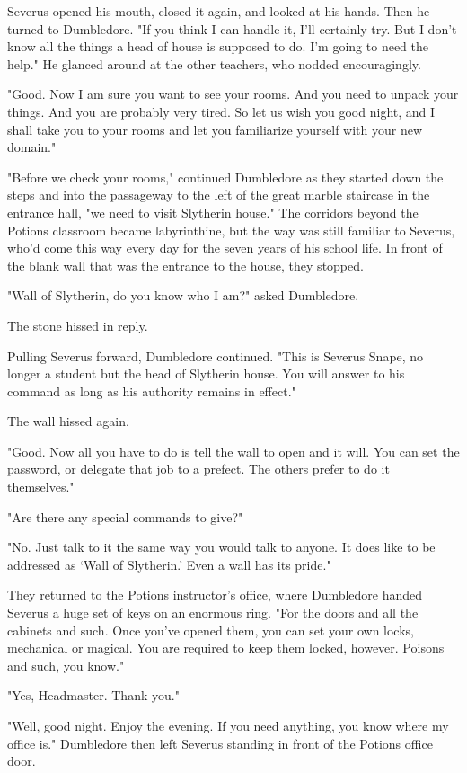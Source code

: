 Severus opened his mouth, closed it again, and looked at his hands. Then he turned to Dumbledore. "If you think I can handle it, I'll certainly try. But I don't know all the things a head of house is supposed to do. I'm going to need the help." He glanced around at the other teachers, who nodded encouragingly.

"Good. Now I am sure you want to see your rooms. And you need to unpack your things. And you are probably very tired. So let us wish you good night, and I shall take you to your rooms and let you familiarize yourself with your new domain."

"Before we check your rooms," continued Dumbledore as they started down the steps and into the passageway to the left of the great marble staircase in the entrance hall, "we need to visit Slytherin house." The corridors beyond the Potions classroom became labyrinthine, but the way was still familiar to Severus, who'd come this way every day for the seven years of his school life. In front of the blank wall that was the entrance to the house, they stopped.

"Wall of Slytherin, do you know who I am?" asked Dumbledore.

The stone hissed in reply.

Pulling Severus forward, Dumbledore continued. "This is Severus Snape, no longer a student but the head of Slytherin house. You will answer to his command as long as his authority remains in effect."

The wall hissed again.

"Good. Now all you have to do is tell the wall to open and it will. You can set the password, or delegate that job to a prefect. The others prefer to do it themselves."

"Are there any special commands to give?"

"No. Just talk to it the same way you would talk to anyone. It does like to be addressed as `Wall of Slytherin.' Even a wall has its pride."

They returned to the Potions instructor's office, where Dumbledore handed Severus a huge set of keys on an enormous ring. "For the doors and all the cabinets and such. Once you've opened them, you can set your own locks, mechanical or magical. You are required to keep them locked, however. Poisons and such, you know."

"Yes, Headmaster. Thank you."

"Well, good night. Enjoy the evening. If you need anything, you know where my office is." Dumbledore then left Severus standing in front of the Potions office door.


